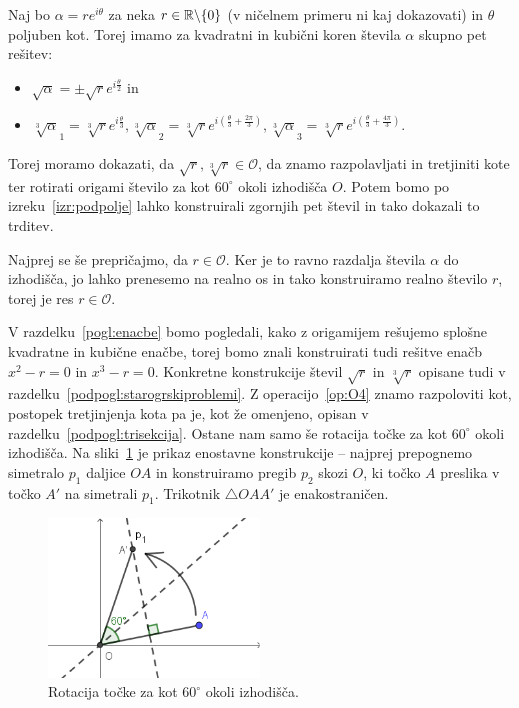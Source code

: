 \begin{dokaz}
    Naj bo $\alpha = r e^{i \theta}$ za neka $r \in \mathbb R \backslash \{0\}$ (v ničelnem primeru ni kaj dokazovati) in $\theta$ poljuben kot. Torej imamo za kvadratni in kubični koren števila $\alpha$ skupno pet rešitev:
    \begin{itemize}
        \item $\sqrt{\alpha} = \pm \sqrt{r}e^{i \frac{\theta}{2}}$ in
        \item $\sqrt[3]{\alpha}_1 = \sqrt[3]{r}e^{i \frac{\theta}{3}}, \sqrt[3]{\alpha}_2 = \sqrt[3]{r}e^{i \left(\frac{\theta}{3} + \frac{2\pi}{3}\right)}, \sqrt[3]{\alpha}_3 = \sqrt[3]{r}e^{i \left(\frac{\theta}{3} + \frac{4\pi}{3}\right)}$.
    \end{itemize}
    Torej moramo dokazati, da $\sqrt{r}, \sqrt[3]{r} \in \mathcal{O}$, da znamo razpolavljati in tretjiniti kote ter rotirati origami število za kot $60^\circ$ okoli izhodišča $O$. Potem bomo po izreku~\ref{izr:podpolje} lahko konstruirali zgornjih pet števil in tako dokazali to trditev.

    Najprej se še prepričajmo, da $r \in \mathcal{O}$. Ker je to ravno razdalja števila $\alpha$ do izhodišča, jo lahko prenesemo na realno os in tako konstruiramo realno število $r$, torej je res $r \in \mathcal{O}$.
    
    V razdelku~\ref{pogl:enacbe} bomo pogledali, kako z origamijem rešujemo splošne kvadratne in kubične enačbe, torej bomo znali konstruirati tudi rešitve enačb $x^2 - r = 0$ in $x^3 - r = 0$. Konkretne konstrukcije števil $\sqrt{r}$ in $\sqrt[3]{r}$ opisane tudi v razdelku~\ref{podpogl:starogrskiproblemi}. Z operacijo~\ref{op:O4} znamo razpoloviti kot, postopek tretjinjenja kota pa je, kot že omenjeno, opisan v razdelku~\ref{podpogl:trisekcija}. Ostane nam samo še rotacija točke za kot $60^\circ$ okoli izhodišča. Na sliki~\ref{fig:kot60_rotacija} je prikaz enostavne konstrukcije -- najprej prepognemo simetralo $p_1$ daljice $OA$ in konstruiramo pregib $p_2$ skozi $O$, ki točko $A$ preslika v točko $A'$ na simetrali $p_1$. Trikotnik $\triangle OAA'$ je enakostraničen. 
    \begin{figure}[h]
        \centering
        \includegraphics[width=0.5\textwidth]{images/algebra/kot60.png}
        \caption[Rotacija točke okoli izhodišča]{Rotacija točke za kot $60^\circ$ okoli izhodišča.}
        \label{fig:kot60_rotacija}
    \end{figure}
\end{dokaz}

